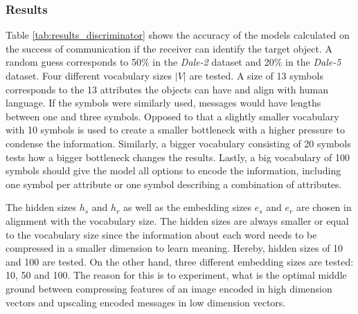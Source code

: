 \subsubsection*{Results}
Table \ref{tab:results_discriminator} shows the accuracy of the models calculated on the success of communication if the receiver can identify the target object.
A random guess corresponds to 50\% in the \emph{Dale-2} dataset and 20\% in the \emph{Dale-5} dataset.
Four different vocabulary sizes $|V|$ are tested.
A size of 13 symbols corresponds to the 13 attributes the objects can have and align with human language.
If the symbols were similarly used, messages would have lengths between one and three symbols.
Opposed to that a slightly smaller vocabulary with 10 symbols is used to create a smaller bottleneck with a higher pressure to condense the information.
Similarly, a bigger vocabulary consisting of 20 symbols tests how a bigger bottleneck changes the results.
Lastly, a big vocabulary of 100 symbols should give the model all options to encode the information, including one symbol per attribute or one symbol describing a combination of attributes.

The hidden sizes $h_s$ and $h_r$ as well as the embedding sizes $e_s$ and $e_r$ are chosen in alignment with the vocabulary size.
The hidden sizes are always smaller or equal to the vocabulary size since the information about each word needs to be compressed in a smaller dimension to learn meaning.
Hereby, hidden sizes of 10 and 100 are tested.
On the other hand, three different embedding sizes are tested: 10, 50 and 100.
The reason for this is to experiment, what is the optimal middle ground between compressing features of an image encoded in high dimension vectors and upscaling encoded messages in low dimension vectors.

